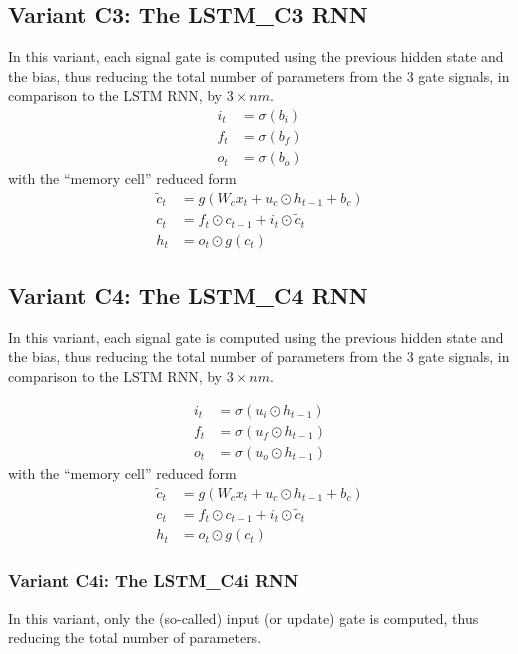 \documentclass{article}
\begin{document}
{{{\subsection{Variant C3: The LSTM\_C3 RNN}
In this variant, each signal gate is computed using the previous hidden state and the bias, thus reducing the total number of parameters from the 3 gate signals, in comparison to the LSTM RNN, by $3 \times nm$.
\begin{align}
	i_t &= \sigma(b_i)\\
	f_t &= \sigma(b_f)\\
	o_t &= \sigma(b_o)
\end{align}
with the ``memory cell'' reduced form
\begin{align}
	\label{eqn:C202}	\tilde{c}_t &= g(W_c x_t + u_c \odot  h_{t-1} + b_c)\\
	\label{eqn:C302}	 c_t &= f_t \odot c_{t-1} + i_t \odot \tilde{c}_t\\
	\label{eqn:C402}	h_t &= o_t \odot g(c_t)
\end{align}

\subsection{Variant C4: The LSTM\_C4 RNN}
In this variant, each signal gate is computed using the previous hidden state and the bias, thus reducing the total number of parameters from the 3 gate signals, in comparison to the LSTM RNN, by $3 \times nm$.

\begin{align}
	i_t &= \sigma(u_i \odot  h_{t-1})\\
	f_t &= \sigma(u_f \odot h_{t-1})\\
	o_t &= \sigma(u_o \odot  h_{t-1})
\end{align}
with the ``memory cell'' reduced form
\begin{align}
	\label{eqn:CC202}	\tilde{c}_t &= g(W_c x_t + u_c \odot  h_{t-1} + b_c)\\
	\label{eqn:CC302}	 c_t &= f_t \odot c_{t-1} + i_t \odot \tilde{c}_t\\
	\label{eqn:CC402}	h_t &= o_t \odot g(c_t)
\end{align}

\subsubsection {Variant C4i: The LSTM\_C4i RNN}

In this variant, only the (so-called) input (or update) gate is computed, thus reducing the total number of parameters.

}}}
\end{document}
